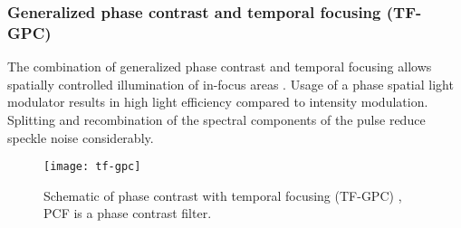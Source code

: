 \subsubsection{Generalized phase contrast and temporal focusing (TF-GPC)}
The combination of generalized phase contrast and temporal focusing
allows spatially controlled illumination of in-focus areas
\citep{Papagiakoumou2010}. Usage of a phase spatial light modulator
results in high light efficiency compared to intensity modulation.
Splitting and recombination of the spectral components of the pulse
reduce speckle noise considerably.
\begin{figure}[!hbt]
  \centering
  \texttt{[image: tf-gpc]} 
  \caption{Schematic of phase contrast with temporal focusing (TF-GPC)
    \citep[from][]{Papagiakoumou2010}, PCF is a phase contrast filter.}
  \label{fig:tf-gpc}
\end{figure}

